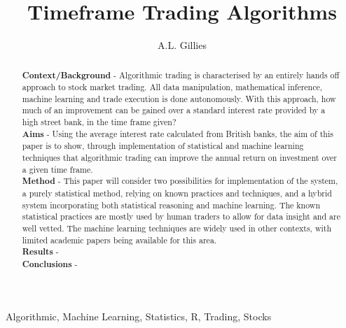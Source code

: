 \documentclass[12pt,a4paper]{article}
\title{Timeframe Trading Algorithms}
\author{A.L. Gillies}
\date{}
\begin{document}
\maketitle

\begin{abstract}
\iffalse
The abstract must be a Structured Abstract with the headings {\bf Context/Background}, {\bf Aims}, {\bf Method}, {\bf Results}, and {\bf Conclusions}.  This section should not be longer than half of a page, and having no more than one or two sentences under each heading is advised.\\
\fi

{\bf Context/Background} - Algorithmic trading is characterised by an entirely hands off approach to stock market trading. All data manipulation, mathematical inference, machine learning and trade execution is done autonomously. With this approach, how much of an improvement can be gained over a standard interest rate provided by a high street bank, in the time frame given?\\

{\bf Aims} - Using the average interest rate calculated from British banks, the aim of this paper is to show, through implementation of statistical and machine learning techniques that algorithmic trading can improve the annual return on investment over a given time frame.\\

{\bf Method} - This paper will consider two possibilities for implementation of the system, a purely statistical method, relying on known practices and techniques, and a hybrid system incorporating both statistical reasoning and machine learning. The known statistical practices are mostly used by human traders to allow for data insight and are well vetted. The machine learning techniques are widely used in other contexts, with limited academic papers being available for this area.\\

{\bf Results} - \\

{\bf Conclusions} - \\
\end{abstract}

\begin{keywords}
Algorithmic, Machine Learning, Statistics, R, Trading, Stocks
\end{keywords}

\iffalse
#################################################################################
\fi
\end{document}
